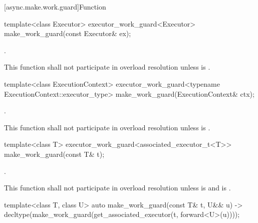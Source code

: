 [async.make.work.guard]{Function }

%
\begin{itemdecl}
template<class Executor>
  executor_work_guard<Executor>
    make_work_guard(const Executor& ex);
\end{itemdecl}

\begin{itemdescr}
\pnum
\returns {}.

\pnum
\remarks This function shall not participate in overload resolution unless
 is .
\end{itemdescr}

%
\begin{itemdecl}
template<class ExecutionContext>
  executor_work_guard<typename ExecutionContext::executor_type>
    make_work_guard(ExecutionContext& ctx);
\end{itemdecl}

\begin{itemdescr}
\pnum
\returns {}.

\pnum
\remarks This function shall not participate in overload resolution unless  is .
\end{itemdescr}

%
\begin{itemdecl}
template<class T>
  executor_work_guard<associated_executor_t<T>>
    make_work_guard(const T& t);
\end{itemdecl}

\begin{itemdescr}
\pnum
\returns {}.

\pnum
\remarks This function shall not participate in overload resolution unless
 is 
and  is .
\end{itemdescr}

%
\begin{itemdecl}
template<class T, class U>
  auto make_work_guard(const T& t, U&& u)
    -> decltype(make_work_guard(get_associated_executor(t, forward<U>(u))));
\end{itemdecl}

